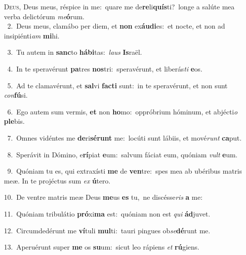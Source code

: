 \lettrine{\initial\textcolor{\initialcolor}{D}}{eus,} Deus meus, réspice in me:~\dagger quare me de\-\textbf{re}\-li\-\textbf{quís}\-ti?~\star longe a salúte mea verba delictórum \textit{me}\-\textbf{ó}rum.\\
{\numbfont\textcolor{\numbcolor}{~2.}}~Deus meus, clamábo per diem, et \textbf{non} ex\-\textbf{áu}\-\textbf{di}es:~\star et nocte, et non ad insipiénti\textit{am} \textbf{mi}\-hi.\par
{\numbfont\textcolor{\numbcolor}{~3.}}~Tu autem in \textbf{sanc}\-to \textbf{há}\-\textbf{bi}tas:~\star \textit{laus} \textbf{Is}\-raël.\par
{\numbfont\textcolor{\numbcolor}{~4.}}~In te speravérunt \textbf{pa}\-tres \textbf{nos}\-tri:~\star speravérunt, et liberás\textit{ti} \textbf{e}\-os.\par
{\numbfont\textcolor{\numbcolor}{~5.}}~Ad te clamavérunt, et \textbf{sal}\-vi \textbf{fac}\-\textbf{ti} sunt:~\star in te speravérunt, et non sunt \textit{con}\-\textbf{fú}si.\par
{\numbfont\textcolor{\numbcolor}{~6.}}~Ego autem sum vermis, \textbf{et} non \textbf{ho}\-mo:~\star oppróbrium hóminum, et abjécti\textit{o} \textbf{ple}\-bis.\par
{\numbfont\textcolor{\numbcolor}{~7.}}~Omnes vidéntes me \textbf{de}\-ri\-\textbf{sé}\-\textbf{runt} me:~\star locúti sunt lábiis, et mové\textit{runt} \textbf{ca}\-put.\par
{\numbfont\textcolor{\numbcolor}{~8.}}~Sperávit in Dómino, e\-\textbf{rí}\-piat \textbf{e}\-um:~\star salvum fáciat eum, quóniam \textit{vult} \textbf{e}\-um.\par
{\numbfont\textcolor{\numbcolor}{~9.}}~Quóniam tu es, qui extraxísti \textbf{me} de \textbf{ven}\-tre:~\star spes mea ab ubéribus matris meæ. In te projéctus sum \textit{ex} \textbf{ú}\-tero.\par
{\numbfont\textcolor{\numbcolor}{10.}}~De ventre matris meæ Deus \textbf{me}\-us \textbf{es} tu,~\star ne discésse\textit{ris} \textbf{a} me:\par
{\numbfont\textcolor{\numbcolor}{11.}}~Quóniam tribulátio \textbf{pró}\-xi\textbf{ma} est:~\star quóniam non est \textit{qui} \textbf{ád}\-juvet.\par
{\numbfont\textcolor{\numbcolor}{12.}}~Circumdedérunt me \textbf{ví}\-tuli \textbf{mul}\-ti:~\star tauri pingues ob\-\textit{se}\-\textbf{dé}runt me.\par
{\numbfont\textcolor{\numbcolor}{13.}}~Aperuérunt super \textbf{me} os \textbf{su}\-um:~\star sicut leo rápiens \textit{et} \textbf{rú}\-giens.\par
